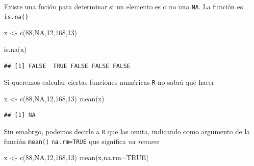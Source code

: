 \documentclass[
]{book}
\newenvironment{Shaded}{\begin{snugshade}}{\end{snugshade}}
\newcommand{\AttributeTok}[1]{\textcolor[rgb]{0.77,0.63,0.00}{#1}}
\newcommand{\ConstantTok}[1]{\textcolor[rgb]{0.00,0.00,0.00}{#1}}
\newcommand{\DecValTok}[1]{\textcolor[rgb]{0.00,0.00,0.81}{#1}}
\newcommand{\FunctionTok}[1]{\textcolor[rgb]{0.00,0.00,0.00}{#1}}
\newcommand{\NormalTok}[1]{#1}
\newcommand{\OtherTok}[1]{\textcolor[rgb]{0.56,0.35,0.01}{#1}}
\begin{document}
Existe una fución para determinar si un elemento es o no una \texttt{NA}. La función es \texttt{is.na()}

\begin{Shaded}
\begin{Highlighting}[]
\NormalTok{x }\OtherTok{\textless{}{-}} \FunctionTok{c}\NormalTok{(}\DecValTok{88}\NormalTok{,}\ConstantTok{NA}\NormalTok{,}\DecValTok{12}\NormalTok{,}\DecValTok{168}\NormalTok{,}\DecValTok{13}\NormalTok{)}
\end{Highlighting}
\end{Shaded}

\begin{Shaded}
\begin{Highlighting}[]
\FunctionTok{is.na}\NormalTok{(x)}
\end{Highlighting}
\end{Shaded}

\begin{verbatim}
## [1] FALSE  TRUE FALSE FALSE FALSE
\end{verbatim}

Si queremos calcular ciertas funciones numéricas \texttt{R} no sabrá qué hacer

\begin{Shaded}
\begin{Highlighting}[]
\NormalTok{x }\OtherTok{\textless{}{-}} \FunctionTok{c}\NormalTok{(}\DecValTok{88}\NormalTok{,}\ConstantTok{NA}\NormalTok{,}\DecValTok{12}\NormalTok{,}\DecValTok{168}\NormalTok{,}\DecValTok{13}\NormalTok{)}
\FunctionTok{mean}\NormalTok{(x)}
\end{Highlighting}
\end{Shaded}

\begin{verbatim}
## [1] NA
\end{verbatim}

Sin emabrgo, podemos decirle a \texttt{R} que las omita, indicando como argumento de la función \texttt{mean()} \texttt{na.rm=TRUE} que significa \emph{na remove}

\begin{Shaded}
\begin{Highlighting}[]
\NormalTok{x }\OtherTok{\textless{}{-}} \FunctionTok{c}\NormalTok{(}\DecValTok{88}\NormalTok{,}\ConstantTok{NA}\NormalTok{,}\DecValTok{12}\NormalTok{,}\DecValTok{168}\NormalTok{,}\DecValTok{13}\NormalTok{)}
\FunctionTok{mean}\NormalTok{(x,}\AttributeTok{na.rm=}\ConstantTok{TRUE}\NormalTok{)}
\end{Highlighting}
\end{Shaded}
\end{document}
